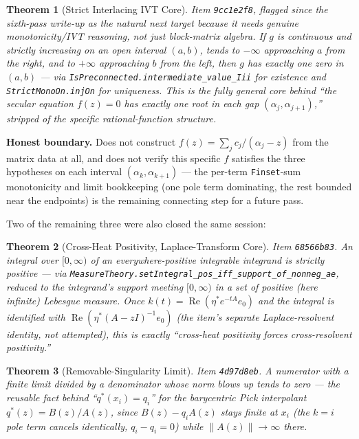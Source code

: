 \documentclass{report}
\newtheorem{theorem}{Theorem}[chapter]
\theoremstyle{definition}
\begin{document}
\begin{theorem}[Strict Interlacing IVT Core]
  \label{thm:weilparity-strict-interlacing-ivt}
  \leanok
  Item \texttt{9cc1e2f8}, flagged since the sixth-pass write-up as the natural next target
  because it needs genuine monotonicity/IVT reasoning, not just block-matrix algebra. If
  $g$ is continuous and strictly increasing on an open interval $(a,b)$, tends to $-\infty$
  approaching $a$ from the right, and to $+\infty$ approaching $b$ from the left, then $g$
  has \emph{exactly one} zero in $(a,b)$ --- via
  \texttt{IsPreconnected.intermediate\_value\_Iii} for existence and
  \texttt{StrictMonoOn.injOn} for uniqueness. This is the fully general core behind ``the
  secular equation $f(z)=0$ has exactly one root in each gap
  $(\alpha_j,\alpha_{j+1})$,'' stripped of the specific rational-function structure.
\end{theorem}

\textbf{Honest boundary.} Does not construct $f(z)=\sum_j c_j/(\alpha_j-z)$ from the
matrix data at all, and does not verify this specific $f$ satisfies the three hypotheses
on each interval $(\alpha_k,\alpha_{k+1})$ --- the per-term \texttt{Finset}-sum
monotonicity and limit bookkeeping (one pole term dominating, the rest bounded near the
endpoints) is the remaining connecting step for a future pass.

Two of the remaining three were also closed the same session:

\begin{theorem}[Cross-Heat Positivity, Laplace-Transform Core]
  \label{thm:weilparity-cross-heat}
  \leanok
  Item \texttt{68566b83}. An integral over $[0,\infty)$ of an everywhere-positive
  integrable integrand is strictly positive --- via
  \texttt{MeasureTheory.setIntegral\_pos\_iff\_support\_of\_nonneg\_ae}, reduced to the
  integrand's support meeting $[0,\infty)$ in a set of positive (here infinite) Lebesgue
  measure. Once $k(t)=\operatorname{Re}(\eta^*e^{-tA}e_0)$ and the integral is identified
  with $\operatorname{Re}(\eta^*(A-zI)^{-1}e_0)$ (the item's separate Laplace-resolvent
  identity, not attempted), this is exactly ``cross-heat positivity forces cross-resolvent
  positivity.''
\end{theorem}

\begin{theorem}[Removable-Singularity Limit]
  \label{thm:weilparity-removable-singularity}
  \leanok
  Item \texttt{4d97d8eb}. A numerator with a finite limit divided by a denominator whose
  norm blows up tends to zero --- the reusable fact behind ``$q^*(x_i)=q_i$'' for the
  barycentric Pick interpolant $q^*(z)=B(z)/A(z)$, since $B(z)-q_iA(z)$ stays finite at
  $x_i$ (the $k=i$ pole term cancels identically, $q_i-q_i=0$) while $\|A(z)\|\to\infty$
  there.
\end{theorem}
\end{document}
